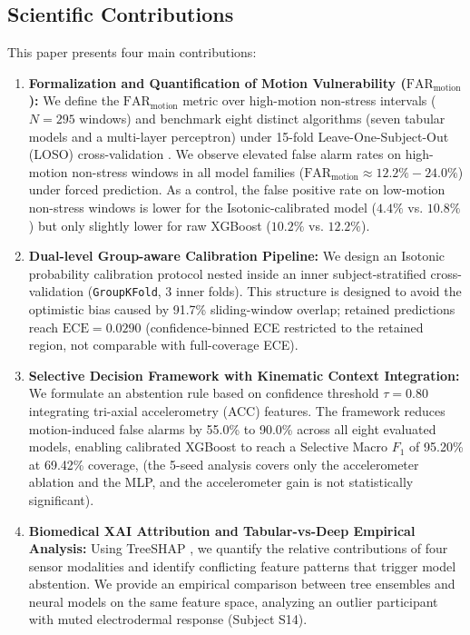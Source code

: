 \documentclass[conference]{IEEEtran}
\begin{document}
\subsection{Scientific Contributions}
This paper presents four main contributions:
\begin{enumerate}
    \item \textbf{Formalization and Quantification of Motion Vulnerability ($\text{FAR}_{\text{motion}}$):} We define the $\text{FAR}_{\text{motion}}$ metric over high-motion non-stress intervals ($N=295$ windows) and benchmark eight distinct algorithms (seven tabular models and a multi-layer perceptron) under 15-fold Leave-One-Subject-Out (LOSO) cross-validation \cite{saeb2017need, little2017using}. We observe elevated false alarm rates on high-motion non-stress windows in all model families ($\text{FAR}_{\text{motion}} \approx 12.2\% - 24.0\%$) under forced prediction. As a control, the false positive rate on low-motion non-stress windows is lower for the Isotonic-calibrated model ($4.4\%$ vs. $10.8\%$) but only slightly lower for raw XGBoost ($10.2\%$ vs. $12.2\%$).
    \item \textbf{Dual-level Group-aware Calibration Pipeline:} We design an Isotonic probability calibration protocol nested inside an inner subject-stratified cross-validation (\texttt{GroupKFold}, 3 inner folds). This structure is designed to avoid the optimistic bias caused by 91.7\% sliding-window overlap; retained predictions reach $\text{ECE} = 0.0290$ (confidence-binned ECE restricted to the retained region, not comparable with full-coverage ECE).
    \item \textbf{Selective Decision Framework with Kinematic Context Integration:} We formulate an abstention rule based on confidence threshold $\tau = 0.80$ integrating tri-axial accelerometry (ACC) features. The framework reduces motion-induced false alarms by 55.0\% to 90.0\% across all eight evaluated models, enabling calibrated XGBoost to reach a Selective Macro $F_1$ of 95.20\% at 69.42\% coverage, (the 5-seed analysis covers only the accelerometer ablation and the MLP, and the accelerometer gain is not statistically significant).
    \item \textbf{Biomedical XAI Attribution and Tabular-vs-Deep Empirical Analysis:} Using TreeSHAP \cite{lundberg2020local}, we quantify the relative contributions of four sensor modalities and identify conflicting feature patterns that trigger model abstention. We provide an empirical comparison between tree ensembles and neural models on the same feature space, analyzing an outlier participant with muted electrodermal response (Subject S14).
\end{enumerate}
\end{document}

